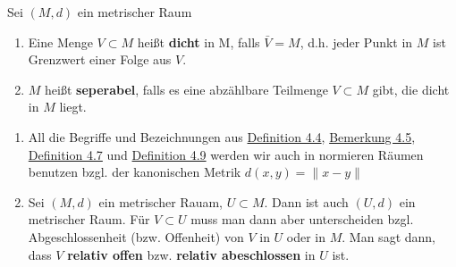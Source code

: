\begin{definition} \label{def:1-4.9}
	Sei $(M, d)$ ein metrischer Raum
	\begin{enumerate}[label=\alph*\upshape)]  
		\item Eine Menge $V \subset M$ hei{\ss}t \textbf{dicht} in M, falls $\bar V = M$, d.h. jeder Punkt in $M$ ist Grenzwert einer Folge aus $V$.
		\item $M$ hei{\ss}t \textbf{seperabel}, falls es eine abzählbare Teilmenge $V \subset M$ gibt, die dicht in $M$ liegt.
	\end{enumerate}
\end{definition}

\begin{bemerkung}
	\begin{enumerate}[label=\alph*\upshape)]
		\item All die Begriffe und Bezeichnungen aus \hyperref[def:1-4.4-abgoff]{Definition 4.4}, \hyperref[bem:1-4.5]{Bemerkung 4.5}, \hyperref[def:1-4.7-abschinnrand]{Definition 4.7} und \hyperref[def:1-4.9]{Definition 4.9} werden wir auch in normieren Räumen benutzen bzgl. der kanonischen Metrik $d(x, y) = \| x - y\|$
		\item Sei $(M, d)$ ein metrischer Rauam, $U \subset M$. Dann ist auch $(U, d)$ ein metrischer Raum. Für $V \subset U$ muss man dann aber unterscheiden bzgl. Abgeschlossenheit (bzw. Offenheit) von $V$ in $U$ oder in $M$. Man sagt dann, dass $V$ \textbf{relativ offen} bzw. \textbf{relativ abeschlossen} in $U$ ist.
	\end{enumerate}	
\end{bemerkung}

